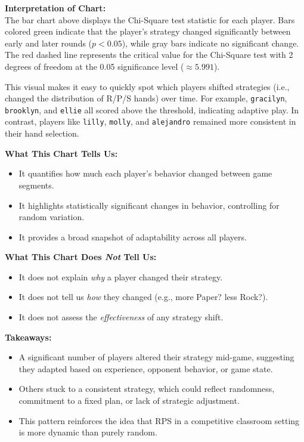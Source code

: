 \documentclass[12pt]{article}
\begin{document}
\noindent\textbf{Interpretation of Chart:}\\
The bar chart above displays the Chi-Square test statistic for each player. Bars colored green indicate that the player's strategy changed significantly between early and later rounds ($p < 0.05$), while gray bars indicate no significant change. The red dashed line represents the critical value for the Chi-Square test with 2 degrees of freedom at the 0.05 significance level ($\approx 5.991$).

This visual makes it easy to quickly spot which players shifted strategies (i.e., changed the distribution of R/P/S hands) over time. For example, \texttt{gracilyn}, \texttt{brooklyn}, and \texttt{ellie} all scored above the threshold, indicating adaptive play. In contrast, players like \texttt{lilly}, \texttt{molly}, and \texttt{alejandro} remained more consistent in their hand selection.

\vspace{1.5cm}

\noindent\textbf{What This Chart Tells Us:}
\begin{itemize}
    \item It quantifies how much each player’s behavior changed between game segments.
    \item It highlights statistically significant changes in behavior, controlling for random variation.
    \item It provides a broad snapshot of adaptability across all players.
\end{itemize}

\noindent\textbf{What This Chart Does \emph{Not} Tell Us:}
\begin{itemize}
    \item It does not explain \textit{why} a player changed their strategy.
    \item It does not tell us \textit{how} they changed (e.g., more Paper? less Rock?).
    \item It does not assess the \textit{effectiveness} of any strategy shift.
\end{itemize}

\noindent\textbf{Takeaways:}
\begin{itemize}
    \item A significant number of players altered their strategy mid-game, suggesting they adapted based on experience, opponent behavior, or game state.
    \item Others stuck to a consistent strategy, which could reflect randomness, commitment to a fixed plan, or lack of strategic adjustment.
    \item This pattern reinforces the idea that RPS in a competitive classroom setting is more dynamic than purely random.
\end{itemize}
\end{document}
